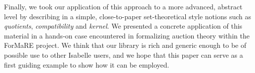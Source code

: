 \documentclass[
]{llncs}
\newcommand{\I}{Isabelle}
\newcommand{\fo}{ForMaRE}
\begin{document}
Finally, we took our application of this approach to a more advanced, abstract level by describing in a simple, close-to-paper set-theoretical style notions such as \emph{quotients}, \emph{compatibility} and \emph{kernel}.
We presented a concrete application of this material in a hands-on case encountered in formalizing auction theory within the \fo{} project.
We think that our library is rich and generic enough to be of possible use to other \I{} users, and we hope that this paper can serve as a first guiding example to show how it can be employed.



\begin{spacing}{0.95}
\printbibliography
\end{spacing}
\end{document}
